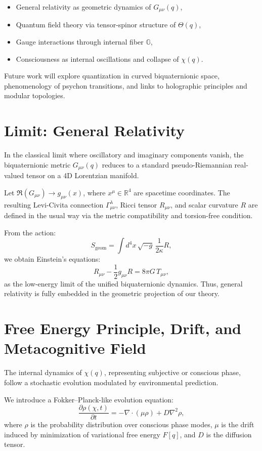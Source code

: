 \documentclass[12pt]{article}
\begin{document}
\begin{itemize}
  \item General relativity as geometric dynamics of \( G_{\mu\nu}(q) \),
  \item Quantum field theory via tensor-spinor structure of \( \Theta(q) \),
  \item Gauge interactions through internal fiber \( \mathbb{G} \),
  \item Consciousness as internal oscillations and collapse of \( \chi(q) \).
\end{itemize}

Future work will explore quantization in curved biquaternionic space, phenomenology of psychon transitions, and links to holographic principles and modular topologies.

\section{Limit: General Relativity}

In the classical limit where oscillatory and imaginary components vanish, the biquaternionic metric \( G_{\mu\nu}(q) \) reduces to a standard pseudo-Riemannian real-valued tensor on a 4D Lorentzian manifold.

Let \( \Re(G_{\mu\nu}) \rightarrow g_{\mu\nu}(x) \), where \( x^\mu \in \mathbb{R}^4 \) are spacetime coordinates. The resulting Levi-Civita connection \( \Gamma^\lambda_{\mu\nu} \), Ricci tensor \( R_{\mu\nu} \), and scalar curvature \( R \) are defined in the usual way via the metric compatibility and torsion-free condition.

From the action:
\[
S_\text{geom} = \int d^4 x \, \sqrt{-g} \, \frac{1}{2\kappa} R,
\]
we obtain Einstein’s equations:
\[
R_{\mu\nu} - \frac{1}{2} g_{\mu\nu} R = 8 \pi G \, T_{\mu\nu},
\]
as the low-energy limit of the unified biquaternionic dynamics. Thus, general relativity is fully embedded in the geometric projection of our theory.


\section{Free Energy Principle, Drift, and Metacognitive Field}

The internal dynamics of \( \chi(q) \), representing subjective or conscious phase, follow a stochastic evolution modulated by environmental prediction.

We introduce a Fokker–Planck-like evolution equation:
\[
\frac{\partial \rho(\chi, t)}{\partial t} = -\nabla \cdot \left( \mu \rho \right) + D \nabla^2 \rho,
\]
where \( \rho \) is the probability distribution over conscious phase modes, \( \mu \) is the drift induced by minimization of variational free energy \( F[q] \), and \( D \) is the diffusion tensor.
\end{document}
